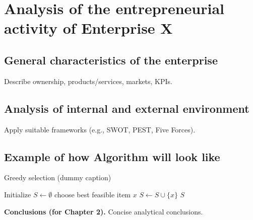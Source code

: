 \chapter{Analysis of the entrepreneurial activity of Enterprise X}
\section{General characteristics of the enterprise}
Describe ownership, products/services, markets, KPIs.

\section{Analysis of internal and external environment}
Apply suitable frameworks (e.g., SWOT, PEST, Five Forces).

\section{Example of how Algorithm will look like}

\begin{algorithm}[h]
\caption{Greedy selection (dummy caption)}
\begin{algorithmic}[1]
  \State Initialize $S \gets \emptyset$
    \State choose best feasible item $x$
    \State $S \gets S \cup \{x\}$
  \EndWhile
  \State \Return $S$
\end{algorithmic}
\label{alg:greedy}
\end{algorithm}

\noindent\textbf{Conclusions (for Chapter 2).} Concise analytical conclusions.
